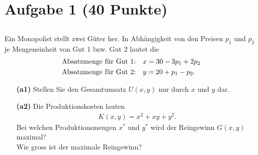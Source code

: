 \vspace{1cm}
\renewcommand{\labelenumi}{\theenumi.}
\section*{Aufgabe 1 (40 Punkte)}
\vspace{0.4cm}
\subsection*{}
Ein Monopolist stellt zwei Güter her.
In Abhängigkeit von den Preisen $ p_1 $ und $ p_2 $ je Mengeneinheit von Gut $ 1 $ bzw. Gut $ 2 $ lautet die
\begin{align*}
	&\textrm{Absatzmenge für Gut $ 1 $:} \quad 
	x = 30 - 3 p_1 + 2 p_2\\
	&\textrm{Absatzmenge für Gut $ 2 $:} \quad
	y = 20 + p_1 - p_2.
\end{align*}
\begin{enumerate}
	\item[\textbf{(a1)}]
	Stellen Sie den Gesamtumsatz $ U(x,y) $ nur durch $ x $ und $ y  $ dar.
	\item[\textbf{(a2)}] 
	Die Produktionskosten lauten
	\begin{align*}
		K(x,y) = x^2 + xy + y^2.
	\end{align*}
	Bei welchen Produktionsmengen $ x^\ast  $ und $ y^\ast $ wird der Reingewinn $ G(x,y) $ maximal?\\
	Wie gross ist der maximale Reingewinn?
\end{enumerate}
\ \\

